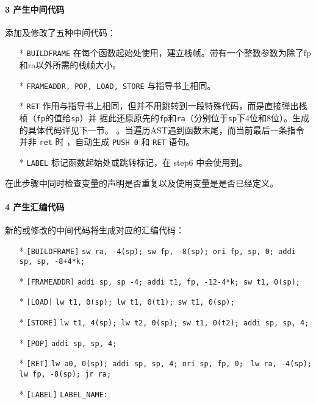 \documentclass[UTF8]{ctexart}
\newcommand{\T}[1]{\texttt{{#1}}}
\begin{document}
            \paragraph{3 产生中间代码} 添加及修改了五种中间代码：
            \begin{itemize}
                \item[*] \T{BUILDFRAME} 在每个函数起始处使用，建立栈帧。带有一个整数参数为除了fp和ra以外所需的栈帧大小。
                \item[*] \T{FRAMEADDR, POP, LOAD, STORE} 与指导书上相同。
                \item[*] \T{RET} 作用与指导书上相同，但并不用跳转到一段特殊代码，而是直接弹出栈桢（\T{fp}的值给\T{sp}）并
                据此还原原先的\T{fp}和\T{ra}（分别位于\T{sp}下4位和8位）。生成的具体代码详见下一节。
                。当遍历AST遇到函数末尾，而当前最后一条指令并非 \T{ret} 时
                ，自动生成 \T{PUSH 0} 和 \T{RET} 语句。
                \item[*] \T{LABEL} 标记函数起始处或跳转标记，在 step6 中会使用到。
            \end{itemize}

            在此步骤中同时检查变量的声明是否重复以及使用变量是是否已经定义。

            \paragraph{4 产生汇编代码} 新的或修改的中间代码将生成对应的汇编代码：
            \begin{itemize}
                \item[*] \T{[BUILDFRAME]} \T{sw ra, -4(sp); sw fp, -8(sp); ori fp, sp, 0; addi sp, sp, -8+4*k;}
                \item[*] \T{[FRAMEADDR]} \T{addi sp, sp -4; addi t1, fp, -12-4*k; sw t1, 0(sp);}
                \item[*] \T{[LOAD]} \T{lw t1, 0(sp); lw t1, 0(t1); sw t1, 0(sp);}
                \item[*] \T{[STORE]} \T{lw t1, 4(sp); lw t2, 0(sp); sw t1, 0(t2); addi sp, sp, 4;} 
                \item[*] \T{[POP]} \T{addi sp, sp, 4;} 
                \item[*] \T{[RET]} \T{lw a0, 0(sp); addi sp, sp, 4; ori sp, fp, 0; } 
                \T{lw ra, -4(sp); lw fp, -8(sp); jr ra;} 
                \item[*] \T{[LABEL]} \T{LABEL\_NAME: }
            \end{itemize}
        
\end{document}
